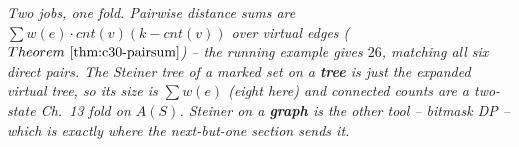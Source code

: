 \begin{recallbox}
\emph{Two jobs, one fold.  Pairwise distance sums are \(\sum \mathit{w}(e)\cdot
\mathit{cnt}(v)(k-\mathit{cnt}(v))\) over virtual edges (\(\thmref{c30-pairsum}\)) -- the
running example gives \(26\), matching all six direct pairs.  The Steiner tree of a
marked set on a \textbf{tree} is just the expanded virtual tree, so its size is
\(\sum\mathit{w}(e)\) (eight here) and connected counts are a two-state Ch.~13 fold on
\(A(S)\).  Steiner on a \textbf{graph} is the other tool -- bitmask DP -- which is
exactly where the next-but-one section sends it.}
\end{recallbox}
